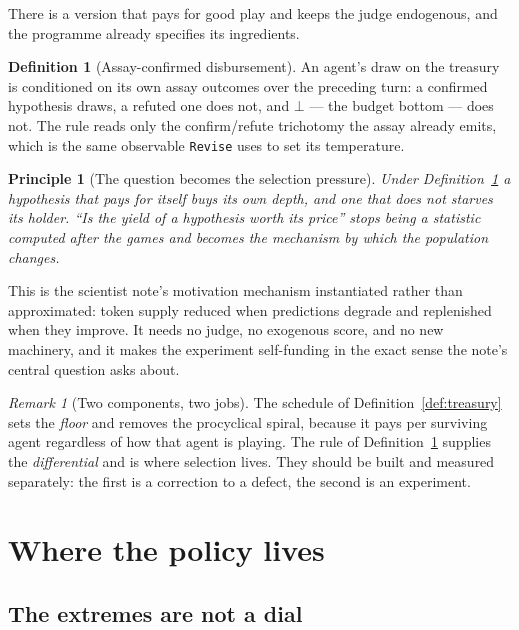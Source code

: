 \documentclass[11pt,a4paper]{article}
\theoremstyle{plain}
\newtheorem{principle}[theorem]{Principle}
\theoremstyle{definition}
\newtheorem{definition}[theorem]{Definition}
\theoremstyle{remark}
\newtheorem{remark}[theorem]{Remark}
\begin{document}
There is a version that pays for good play and keeps the judge endogenous, and
the programme already specifies its ingredients.

\begin{definition}[Assay-confirmed disbursement]
\label{def:assaypay}
An agent's draw on the treasury is conditioned on its own assay outcomes over
the preceding turn: a confirmed hypothesis draws, a refuted one does not, and
$\bot$ --- the budget bottom --- does not. The rule reads only the
confirm/refute trichotomy the assay already emits, which is the same observable
\texttt{Revise} uses to set its temperature.
\end{definition}

\begin{principle}[The question becomes the selection pressure]
\label{prin:selection}
Under Definition~\ref{def:assaypay} a hypothesis that pays for itself buys its
own depth, and one that does not starves its holder. ``Is the yield of a
hypothesis worth its price'' stops being a statistic computed after the games
and becomes the mechanism by which the population changes.
\end{principle}

This is the scientist note's motivation mechanism instantiated rather than
approximated: token supply reduced when predictions degrade and replenished when
they improve. It needs no judge, no exogenous score, and no new machinery, and
it makes the experiment self-funding in the exact sense the note's central
question asks about.

\begin{remark}[Two components, two jobs]
\label{rem:twojobs}
The schedule of Definition~\ref{def:treasury} sets the \emph{floor} and removes
the procyclical spiral, because it pays per surviving agent regardless of how
that agent is playing. The rule of Definition~\ref{def:assaypay} supplies the
\emph{differential} and is where selection lives. They should be built and
measured separately: the first is a correction to a defect, the second is an
experiment.
\end{remark}

\section{Where the policy lives}
\label{sec:policy}

\subsection{The extremes are not a dial}
\end{document}
